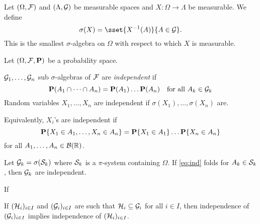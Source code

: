 \begin{definition}
    Let $(\Omega, \mathcal F)$ and $(\Lambda, \mathcal{G})$ be measurable spaces
    and $X\colon \Omega \to \Lambda$ be measurable.
    We define \[
        \sigma(X) = \sset{X^{-1}(A)}{A \in \mcG}.
    \] This is the smallest $\sigma$-algebra on $\Omega$ with respect to
    which $X$ is measurable.
\end{definition}
Let $(\Omega, \mathcal F, \operatorname{\mathbf P})$ be a probability space.
\begin{definition}[Independence] \label{def:ind}
    $\mathcal{G}_1, \dots, \mathcal{G}_n$ sub $\sigma$-algebras of $\mathcal F$ are
    \emph{independent} if \begin{equation}
        \operatorname{\mathbf P}(A_1 \cap \dots \cap A_n) = \operatorname{\mathbf P}(A_1) \dots \operatorname{\mathbf P}(A_n)
        \quad \text{for all } A_k \in \mathcal{G}_k \label{eq:ind}
    \end{equation} Random variables $X_1, \dots, X_n$ are independent if
    $\sigma(X_1), \dots, \sigma(X_n)$ are.
\end{definition}
Equivalently, $X_i$'s are independent if \[
    \operatorname{\mathbf P}\{X_1 \in A_1, \dots, X_n \in A_n\}
    = \operatorname{\mathbf P}\{X_1 \in A_1\} \dots \operatorname{\mathbf P}\{X_n \in A_n\}
\] for all $A_1, \dots, A_n \in \mathcal B(\mathbb{R})$.
\begin{lemma} \label{thm:ind:pi}
    Let $\mathcal{G}_k = \sigma(\mathcal{S}_k)$ where $\mathcal{S}_k$ is a $\pi$-system
    containing $\Omega$.
    If \cref{eq:ind} folds for $A_k \in \mathcal{S}_k$, then $\mathcal{G}_k$ are
    independent.
\end{lemma}
\begin{example}
    If 
\end{example}

\begin{exercise}
    If $(\mathcal{H}_i)_{i \in I}$ and $(\mathcal{G}_i)_{i \in I}$ are such that
    $\mathcal{H}_i \subseteq \mathcal{G}_i$ for all $i \in I$, then
    independence of $(\mathcal{G}_i)_{i \in I}$ implies independence of
    $(\mathcal{H}_i)_{i \in I}$.
\end{exercise}

